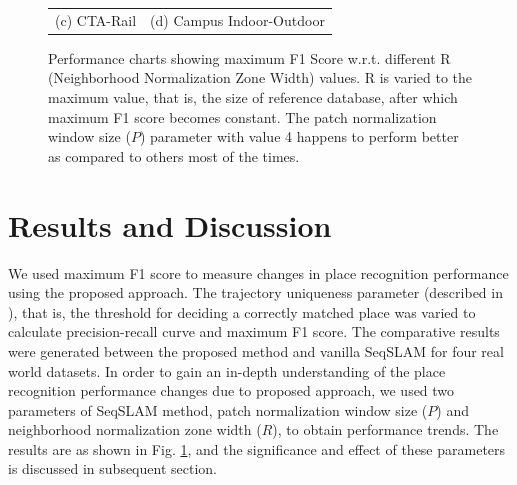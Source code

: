 \documentclass[letterpaper, 10 pt, conference]{ieeeconf}  %
\begin{document}
\begin{figure}
\begin{tabular*}{\textwidth}[t]{cc}
(c) CTA-Rail & (d) Campus Indoor-Outdoor \\
 \end{tabular*}
 \caption{Performance charts showing maximum F1 Score w.r.t. different R (Neighborhood Normalization Zone Width) values. R is varied to the maximum value, that is, the size of reference database, after which maximum F1 score becomes constant. The patch normalization window size ($P$) parameter with value 4 happens to perform better as compared to others most of the times.}
 \label{fig:performanceChart}
\end{figure}


\section{Results and Discussion}
We used maximum F1 score to measure changes in place recognition performance using the proposed approach. The trajectory uniqueness parameter (described in \cite{Milford2012}), that is, the threshold for deciding a correctly matched place was varied to calculate precision-recall curve and maximum F1 score. The comparative results were generated between the proposed method and vanilla SeqSLAM for four real world datasets. In order to gain an in-depth understanding of the place recognition performance changes due to proposed approach, we used two parameters of SeqSLAM method, patch normalization window size ($P$) and neighborhood normalization zone width ($R$), to obtain performance trends. The results are as shown in Fig. \ref{fig:performanceChart}, and the significance and effect of these parameters is discussed in subsequent section. 
\end{document}
